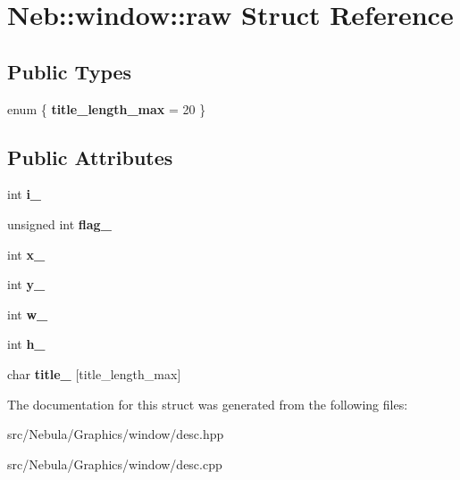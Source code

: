 \hypertarget{structNeb_1_1window_1_1raw}{\section{\-Neb\-:\-:window\-:\-:raw \-Struct \-Reference}
\label{structNeb_1_1window_1_1raw}
}
\subsection*{\-Public \-Types}
\begin{DoxyCompactItemize}
\item 
enum \{ {\bfseries title\-\_\-length\-\_\-max} =  20
 \}
\end{DoxyCompactItemize}
\subsection*{\-Public \-Attributes}
\begin{DoxyCompactItemize}
\item 
\hypertarget{structNeb_1_1window_1_1raw_ac2d99106d8032d157cb66ca692aeff8f}{int {\bfseries i\-\_\-}}\label{structNeb_1_1window_1_1raw_ac2d99106d8032d157cb66ca692aeff8f}

\item 
\hypertarget{structNeb_1_1window_1_1raw_a187363b5fae5c15e7235744dc9de7bf0}{unsigned int {\bfseries flag\-\_\-}}\label{structNeb_1_1window_1_1raw_a187363b5fae5c15e7235744dc9de7bf0}

\item 
\hypertarget{structNeb_1_1window_1_1raw_a3b273ad1ae7bcf1ae970e71d2693cf86}{int {\bfseries x\-\_\-}}\label{structNeb_1_1window_1_1raw_a3b273ad1ae7bcf1ae970e71d2693cf86}

\item 
\hypertarget{structNeb_1_1window_1_1raw_af41502c09220bda97a5b7affa78289b7}{int {\bfseries y\-\_\-}}\label{structNeb_1_1window_1_1raw_af41502c09220bda97a5b7affa78289b7}

\item 
\hypertarget{structNeb_1_1window_1_1raw_aa923cceefa9f2f721465c4369ff1dd7d}{int {\bfseries w\-\_\-}}\label{structNeb_1_1window_1_1raw_aa923cceefa9f2f721465c4369ff1dd7d}

\item 
\hypertarget{structNeb_1_1window_1_1raw_ac4be48fbeb00c89151f8f36528a4fbc7}{int {\bfseries h\-\_\-}}\label{structNeb_1_1window_1_1raw_ac4be48fbeb00c89151f8f36528a4fbc7}

\item 
\hypertarget{structNeb_1_1window_1_1raw_aa97e82faf39cfcdf355bfe1efca9f3da}{char {\bfseries title\-\_\-} \mbox{[}title\-\_\-length\-\_\-max\mbox{]}}\label{structNeb_1_1window_1_1raw_aa97e82faf39cfcdf355bfe1efca9f3da}

\end{DoxyCompactItemize}


\-The documentation for this struct was generated from the following files\-:\begin{DoxyCompactItemize}
\item 
src/\-Nebula/\-Graphics/window/desc.\-hpp\item 
src/\-Nebula/\-Graphics/window/desc.\-cpp\end{DoxyCompactItemize}
